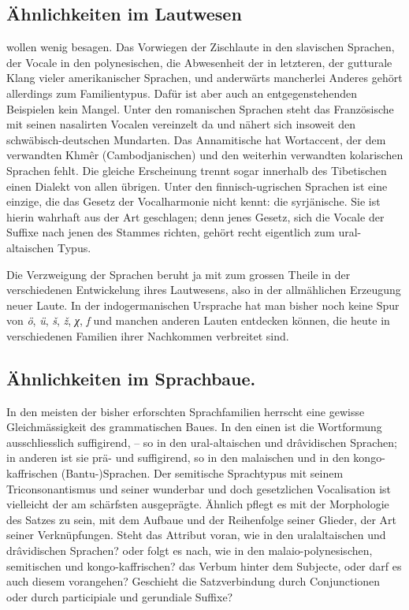 \subsection*{ Ähnlichkeiten im Lautwesen}\label{III.I.I.2Adalpha}
wollen wenig besagen. Das Vorwiegen der Zischlaute in den slavischen Sprachen, der Vocale in den polynesischen, die Abwesenheit der  in letzteren, der gutturale Klang vieler amerikanischer Sprachen, und anderwärts mancherlei Anderes gehört allerdings zum Familientypus. Dafür ist aber auch an entgegenstehenden Beispielen kein Mangel. Unter den romanischen Sprachen steht das Französische mit seinen nasalirten Vocalen vereinzelt da und nähert sich insoweit den schwäbisch-deutschen Mundarten. Das Annamitische hat Wortaccent, der dem verwandten Khmêr (Cambodjanischen) und den weiterhin verwandten kolarischen Sprachen fehlt. Die gleiche Erscheinung trennt sogar innerhalb des Tibetischen einen Dialekt von allen übrigen. Unter den finnisch-ugrischen \label{sp.149} Sprachen ist eine einzige, die das Gesetz der Vocalharmonie nicht kennt: die syrjänische. Sie ist hierin wahrhaft aus der Art geschlagen; denn jenes Gesetz,  sich die Vocale der Suffixe nach jenen des Stammes richten, gehört recht eigentlich zum ural-altaischen Typus.

Die Verzweigung der Sprachen beruht ja mit zum grossen Theile in der verschiedenen Entwickelung ihres Lautwesens, also in der allmählichen Erzeugung neuer Laute. In der indogermanischen Ursprache hat man bisher noch keine Spur von \textit{ö}, \textit{ü}, \textit{š}, \textit{ž}, \textit{χ}, \textit{f} und manchen anderen Lauten entdecken können, die heute in verschiedenen Familien ihrer Nachkommen verbreitet sind.

\subsection*{ Ähnlichkeiten im Sprachbaue.}\label{III.I.I.2Adbeta}
In den meisten der bisher erforschten Sprachfamilien herrscht eine gewisse Gleichmässigkeit des grammatischen Baues. In den einen ist die Wortformung ausschliesslich suffigirend, – so in den ural-altaischen und drâvidischen Sprachen; in anderen ist sie prä- und suffigirend, so in den malaischen und in den kongo-kaffrischen (Bantu-)Sprachen. Der semitische Sprachtypus mit seinem Triconsonantismus und seiner wunderbar  und doch gesetzlichen Vocalisation ist vielleicht der am schärfsten ausgeprägte. Ähnlich pflegt es mit der Morphologie des Satzes zu sein, mit dem Aufbaue und der Reihenfolge seiner Glieder, der Art seiner Verknüpfungen. Steht das Attribut voran, wie in den \label{fp.159} uralaltaischen und drâvidischen Sprachen? oder folgt es nach, wie in den malaio-polynesischen, semitischen und kongo-kaffrischen?  das Verbum hinter dem Subjecte, oder darf es auch diesem vorangehen? Geschieht die Satzverbindung durch Conjunctionen oder durch participiale und gerundiale Suffixe?

